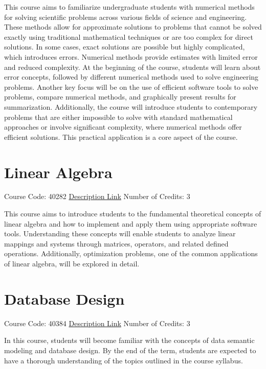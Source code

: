 \documentclass[
fontsize=11pt,
paper=a4,
parskip=half,
enlargefirstpage=off,    %
fromalign=right,        %
fromphone=on,           %
fromemail=on,
fromrule=off,           %
addrfield=off,          %
backaddress=on,         %
subject=beforeopening,  %
locfield=narrow,        %
foldmarks=off,          %
open=any
]{scrartcl}
\begin{document}
This course aims to familiarize undergraduate students with numerical methods for solving scientific problems across various fields of science and engineering. These methods allow for approximate solutions to problems that cannot be solved exactly using traditional mathematical techniques or are too complex for direct solutions. In some cases, exact solutions are possible but highly complicated, which introduces errors. Numerical methods provide estimates with limited error and reduced complexity. At the beginning of the course, students will learn about error concepts, followed by different numerical methods used to solve engineering problems. Another key focus will be on the use of efficient software tools to solve problems, compare numerical methods, and graphically present results for summarization. Additionally, the course will introduce students to contemporary problems that are either impossible to solve with standard mathematical approaches or involve significant complexity, where numerical methods offer efficient solutions. This practical application is a core aspect of the course.


\section{Linear Algebra}
Course Code: 40282 \qquad \quad \href{https://docs.ce.sharif.edu/course/40282}{Description Link}
\qquad \quad Number of Credits: 3

This course aims to introduce students to the fundamental theoretical concepts of linear algebra and how to implement and apply them using appropriate software tools. Understanding these concepts will enable students to analyze linear mappings and systems through matrices, operators, and related defined operations. Additionally, optimization problems, one of the common applications of linear algebra, will be explored in detail.


\section{Database Design}
Course Code: 40384 \qquad \quad \href{https://docs.ce.sharif.edu/course/40384}{Description Link}
\qquad \quad Number of Credits: 3

In this course, students will become familiar with the concepts of data semantic modeling and database design. By the end of the term, students are expected to have a thorough understanding of the topics outlined in the course syllabus.
\end{document}
